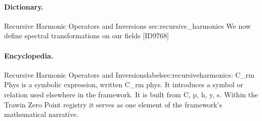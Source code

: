 \paragraph{Dictionary.}
Recursive Harmonic Operators and Inversions sec:recursive\_harmonics We now define spectral transformations on our fields [ID9768]

\paragraph{Encyclopedia.}
Recursive Harmonic Operators and Inversionslabelsec:recursiveharmonics: C\_rm Phys is a symbolic expression, written C\_rm phys. It introduces a symbol or relation used elsewhere in the framework. It is built from C, p, h, y, s. Within the Trawin Zero Point registry it serves as one element of the framework's mathematical narrative.
